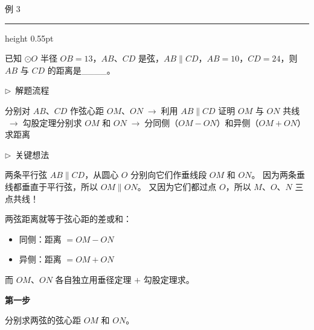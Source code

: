 \documentclass{exam-zh}
\newcommand{\edukai}{\kaishu}
\newenvironment{eduSubQuestionItem}[1]{%
  \needspace{4\baselineskip}%
  \vspace{2mm}
  \par\noindent
  \hangindent=8mm\hangafter=1
  {\color{edu-blue}\bfseries #1}\enspace
  \begingroup
  \color{edu-ink}
}{%
  \endgroup
  \par
  \vspace{3mm}
}
\newenvironment{eduAuxItem}[1]{%
  \needspace{4\baselineskip}%
  \vspace{2mm}
  \par\noindent
  \hangindent=8mm\hangafter=1
  {\color{edu-blue}\edukai $\triangleright$~#1}\enspace
  \begingroup
  \color{edu-ink}
  \edukai
}{%
  \endgroup
  \par
  \vspace{4mm}
}
\newenvironment{eduProblemBlock}[1][题目]{%
  \needspace{8\baselineskip}
  {\small\color{edu-muted}#1}\par
  \vspace{1.5mm}
  {\color{edu-blue}\hrule height 0.55pt}
  \vspace{4.5mm}
  \begingroup
  \color{edu-ink}
  \large
  \setlength{\parskip}{2.2mm}
  \linespread{1.20}\selectfont
}{%
  \par
  \endgroup
  \vspace{6mm}
}
\begin{document}
\begin{eduProblemBlock}[例 3]
已知 $\odot O$ 半径 $OB = 13$，$AB$、$CD$ 是弦，$AB \parallel CD$，$AB = 10$，$CD = 24$，则 $AB$ 与 $CD$ 的距离是\_\_\_\_。
\end{eduProblemBlock}









\begin{eduAuxItem}{解题流程}
分别对 $AB$、$CD$ 作弦心距 $OM$、$ON$$\;\to\;$利用 $AB \parallel CD$ 证明 $OM$ 与 $ON$ 共线$\;\to\;$勾股定理分别求 $OM$ 和 $ON$$\;\to\;$分同侧（$OM - ON$）和异侧（$OM + ON$）求距离\end{eduAuxItem}




\begin{eduAuxItem}{关键想法}
两条平行弦 $AB \parallel CD$，从圆心 $O$ 分别向它们作垂线段 $OM$ 和 $ON$。
因为两条垂线都垂直于平行弦，所以 $OM \parallel ON$。
又因为它们都过点 $O$，所以 $M$、$O$、$N$ 三点共线！

两弦距离就等于弦心距的差或和：
\begin{itemize}
  \item 同侧：距离 $= OM - ON$
  \item 异侧：距离 $= OM + ON$
\end{itemize}
而 $OM$、$ON$ 各自独立用垂径定理 $+$ 勾股定理求。
\end{eduAuxItem}




\begin{eduSubQuestionItem}{第一步}
分别求两弦的弦心距 $OM$ 和 $ON$。\end{eduSubQuestionItem}
\end{document}

